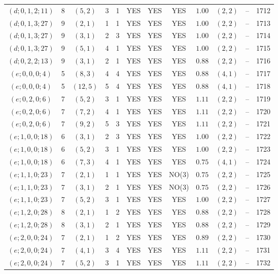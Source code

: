 \begin{longtable}{|c|c|c|c|c|c|c|c|c|c|c|c|}
$(d;0,1,2;11)$ & 8 & $(5,2)$ & 3 & 1 & YES & YES & YES & $1.00$ & $(2,2)$ & -- & 1712\\
$(d;0,1,3;27)$ & 9 & $(2,1)$ & 1 & 1 & YES & YES & YES & $1.00$ & $(2,2)$ & -- & 1713\\
$(d;0,1,3;27)$ & 9 & $(3,1)$ & 2 & 3 & YES & YES & YES & $1.00$ & $(2,2)$ & -- & 1714\\
$(d;0,1,3;27)$ & 9 & $(5,1)$ & 4 & 1 & YES & YES & YES & $1.00$ & $(2,2)$ & -- & 1715\\
$(d;0,2,2;13)$ & 9 & $(3,1)$ & 2 & 1 & YES & YES & YES & $0.88$ & $(2,2)$ & -- & 1716\\
$(e;0,0,0;4)$ & 5 & $(8,3)$ & 4 & 4 & YES & YES & YES & $0.88$ & $(4,1)$ & -- & 1717\\
$(e;0,0,0;4)$ & 5 & $(12,5)$ & 5 & 4 & YES & YES & YES & $0.88$ & $(4,1)$ & -- & 1718\\
$(e;0,2,0;6)$ & 7 & $(5,2)$ & 3 & 1 & YES & YES & YES & $1.11$ & $(2,2)$ & -- & 1719\\
$(e;0,2,0;6)$ & 7 & $(7,2)$ & 4 & 1 & YES & YES & YES & $1.11$ & $(2,2)$ & -- & 1720\\
$(e;0,2,0;6)$ & 7 & $(9,2)$ & 5 & 3 & YES & YES & YES & $1.11$ & $(2,2)$ & -- & 1721\\
$(e;1,0,0;18)$ & 6 & $(3,1)$ & 2 & 3 & YES & YES & YES & $1.00$ & $(2,2)$ & -- & 1722\\
$(e;1,0,0;18)$ & 6 & $(5,2)$ & 3 & 1 & YES & YES & YES & $1.00$ & $(2,2)$ & -- & 1723\\
$(e;1,0,0;18)$ & 6 & $(7,3)$ & 4 & 1 & YES & YES & YES & $0.75$ & $(4,1)$ & -- & 1724\\
$(e;1,1,0;23)$ & 7 & $(2,1)$ & 1 & 1 & YES & YES & NO(3) & $0.75$ & $(2,2)$ & -- & 1725\\
$(e;1,1,0;23)$ & 7 & $(3,1)$ & 2 & 1 & YES & YES & NO(3) & $0.75$ & $(2,2)$ & -- & 1726\\
$(e;1,1,0;23)$ & 7 & $(5,2)$ & 3 & 1 & YES & YES & YES & $1.00$ & $(2,2)$ & -- & 1727\\
$(e;1,2,0;28)$ & 8 & $(2,1)$ & 1 & 2 & YES & YES & YES & $0.88$ & $(2,2)$ & -- & 1728\\
$(e;1,2,0;28)$ & 8 & $(3,1)$ & 2 & 1 & YES & YES & YES & $0.88$ & $(2,2)$ & -- & 1729\\
$(e;2,0,0;24)$ & 7 & $(2,1)$ & 1 & 2 & YES & YES & YES & $0.89$ & $(2,2)$ & -- & 1730\\
$(e;2,0,0;24)$ & 7 & $(4,1)$ & 3 & 4 & YES & YES & YES & $1.11$ & $(2,2)$ & -- & 1731\\
$(e;2,0,0;24)$ & 7 & $(5,2)$ & 3 & 1 & YES & YES & YES & $1.11$ & $(2,2)$ & -- & 1732\\

\end{longtable}
